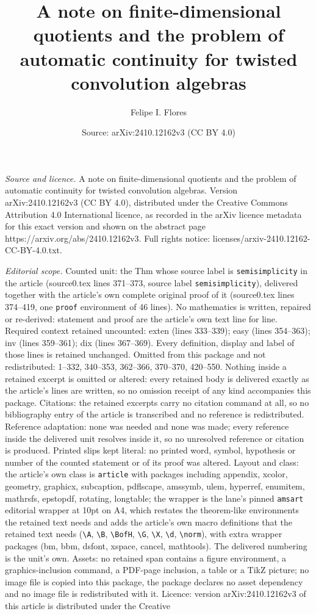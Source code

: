 \documentclass[10pt,a4paper]{amsart}
\title[A note on finite-dimensional quotients and the problem of au]{A note on finite-dimensional quotients and the problem of automatic continuity for twisted convolution algebras}
\author{Felipe I. Flores}
\date{Source: arXiv:2410.12162v3 (CC BY 4.0)}
\begin{document}
\maketitle

\noindent\emph{Source and licence.} A note on finite-dimensional quotients and the problem of automatic continuity for twisted convolution algebras. Version arXiv:2410.12162v3 (CC BY 4.0), distributed under the Creative Commons Attribution 4.0 International licence, as recorded in the arXiv licence metadata for this exact version and shown on the abstract page https://arxiv.org/abs/2410.12162v3. Full rights notice: licenses/arxiv-2410.12162-CC-BY-4.0.txt.\par\smallskip

\noindent\textit{Editorial scope.} Counted unit: the Thm whose source label is \texttt{semisimplicity} in the article (source0.tex lines 371--373, source label \texttt{semisimplicity}), delivered together with the article's own complete original proof of it (source0.tex lines 374--419, one \texttt{proof} environment of 46 lines). No mathematics is written, repaired or re-derived: statement and proof are the article's own text line for line. Required context retained uncounted: exten (lines 333--339); easy (lines 354--363); inv (lines 359--361); dix (lines 367--369). Every definition, display and label of those lines is retained unchanged. Omitted from this package and not redistributed: 1--332, 340--353, 362--366, 370--370, 420--550. Nothing inside a retained excerpt is omitted or altered: every retained body is delivered exactly as the article's lines are written, so no omission receipt of any kind accompanies this package. Citations: the retained excerpts carry no citation command at all, so no bibliography entry of the article is transcribed and no reference is redistributed. Reference adaptation: none was needed and none was made; every reference inside the delivered unit resolves inside it, so no unresolved reference or citation is produced. Printed slips kept literal: no printed word, symbol, hypothesis or number of the counted statement or of its proof was altered. Layout and class: the article's own class is \texttt{article} with packages including appendix, xcolor, geometry, graphicx, subcaption, pdflscape, amssymb, ulem, hyperref, enumitem, mathrsfs, epstopdf, rotating, longtable; the wrapper is the lane's pinned \texttt{amsart} editorial wrapper at 10pt on A4, which restates the theorem-like environments the retained text needs and adds the article's own macro definitions that the retained text needs (\texttt{\textbackslash A}, \texttt{\textbackslash B}, \texttt{\textbackslash BofH}, \texttt{\textbackslash G}, \texttt{\textbackslash X}, \texttt{\textbackslash d}, \texttt{\textbackslash norm}), with extra wrapper packages (bm, bbm, dsfont, xspace, cancel, mathtools). The delivered numbering is the unit's own. Assets: no retained span contains a figure environment, a graphics-inclusion command, a PDF-page inclusion, a table or a TikZ picture; no image file is copied into this package, the package declares no asset dependency and no image file is redistributed with it. Licence: version arXiv:2410.12162v3 of this article is distributed under the Creative 
\end{document}
